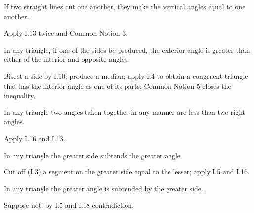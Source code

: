 \begin{claim}
\label{prop:I.15}
If two straight lines cut one another, they make the vertical angles
equal to one another.
\end{claim}
\begin{evidence}[Proof of I.15]
\label{ev:I.15}
Apply I.13 twice and Common Notion 3.
\end{evidence}

\begin{claim}
\label{prop:I.16}
In any triangle, if one of the sides be produced, the exterior angle
is greater than either of the interior and opposite angles.
\end{claim}
\begin{evidence}[Proof of I.16]
\label{ev:I.16}
Bisect a side by I.10; produce a median; apply I.4 to obtain a
congruent triangle that has the interior angle as one of its parts;
Common Notion 5 closes the inequality.
\end{evidence}

\begin{claim}
\label{prop:I.17}
In any triangle two angles taken together in any manner are less than
two right angles.
\end{claim}
\begin{evidence}[Proof of I.17]
\label{ev:I.17}
Apply I.16 and I.13.
\end{evidence}

\begin{claim}
\label{prop:I.18}
In any triangle the greater side subtends the greater angle.
\end{claim}
\begin{evidence}[Proof of I.18]
\label{ev:I.18}
Cut off (I.3) a segment on the greater side equal to the lesser;
apply I.5 and I.16.
\end{evidence}

\begin{claim}
\label{prop:I.19}
In any triangle the greater angle is subtended by the greater side.
\end{claim}
\begin{evidence}[Proof of I.19]
\label{ev:I.19}
Suppose not; by I.5 and I.18 contradiction.
\end{evidence}

